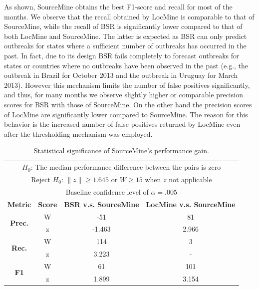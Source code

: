 \documentclass[conference]{IEEEtran}
\newcommand{\fullmodel}{{{\sf SourceMine}}\xspace}
\newcommand{\locationmodel}{{\sf LocMine}\xspace}
\begin{document}
As shown, \fullmodel  obtains the best F1-score and recall for most of the months. We observe that the recall obtained by \locationmodel is comparable to that of \fullmodel, while the recall of BSR is significantly lower compared to that of both \locationmodel and \fullmodel. The latter is expected as BSR can only predict outbreaks for states where a sufficient number of outbreaks has occurred in the past. In fact, due to its design BSR fails completely to forecast outbreaks for states or countries where no outbreaks have been observed in the past (e.g., the outbreak in Brazil for October 2013 and the outbreak in Uruguay for March 2013).  However this mechanism limits the number of false positives significantly, and thus, for many months we observe slightly higher or comparable precision scores for BSR with those of \fullmodel. On the other hand the precision scores of \locationmodel are significantly lower compared to \fullmodel. The reason for this behavior is the increased number of false positives returned by \locationmodel even after the thresholding mechanism was employed. 

\begin{table}[h]
 \centering
\caption{Statistical significance of \fullmodel's performance gain.}
\begin{tabular}{|c|c|c|c|} 
\multicolumn{4}{c}{$H_0$: The median performance difference between the pairs is zero} \\
\multicolumn{4}{c}{Reject $H_0$: $\|z\| \geq 1.645$ or $W \geq 15$ when $z$ not applicable} \\ 
\multicolumn{4}{c}{Baseline confidence level of $\alpha =.005$} \\ \hline
{\bf Metric} & {\bf Score} & {\bf BSR v.s. \fullmodel} & {\bf \locationmodel v.s. \fullmodel} \\ \hline
\multirow{2}{*}{{\bf Prec.}} & W & -51 & 81\\
& z & -1.463 & 2.966 \\ \hline
\multirow{2}{*}{{\bf Rec.}} & W & 114 & 3\\
& z & 3.223 & -\\ \hline
\multirow{2}{*}{{\bf F1}} & W & 61 & 101\\
& z & 1.899 & 3.154\\ \hline
\end{tabular}
\label{tab:significance}
\end{table}
\end{document}
